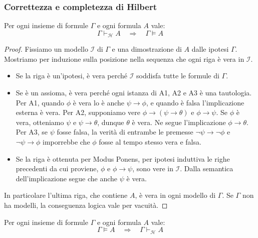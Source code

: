 \subsubsection*{Correttezza e completezza di Hilbert}
\noindent
\colorbox{SALZO}{\parbox{\dimexpr\linewidth-2\fboxsep}{
\begin{theorem}
    Per ogni insieme di formule $\Gamma$ e ogni formula $A$ vale:
    \[
        \Gamma\vdash_{\mathcal{H}} A
        \quad\Longrightarrow\quad
        \Gamma\models A
    \]
\end{theorem}
}}%

\begin{proof}
    Fissiamo un modello $\mathcal{I}$ di $\Gamma$ e una dimostrazione
    di $A$ dalle ipotesi $\Gamma$. Mostriamo per induzione sulla
    posizione nella sequenza che ogni riga è vera in $\mathcal{I}$.
    \begin{itemize}
        \item Se la riga è un'ipotesi, è vera perché $\mathcal{I}$
        soddisfa tutte le formule di $\Gamma$.
        \item Se è un assioma, è vera perché ogni istanza di A1, A2
        e A3 è una tautologia. Per A1, quando $\phi$ è vera lo è
        anche $\psi\to\phi$, e quando è falsa l'implicazione esterna
        è vera. Per A2, supponiamo vere $\phi\to(\psi\to\theta)$
        e $\phi\to\psi$. Se $\phi$ è vera, otteniamo $\psi$ e
        $\psi\to\theta$, dunque $\theta$ è vera. Ne segue
        l'implicazione $\phi\to\theta$. Per A3, se $\psi$ fosse
        falsa, la verità di entrambe le premesse
        $\neg\psi\to\neg\phi$ e $\neg\psi\to\phi$ imporrebbe
        che $\phi$ fosse al tempo stesso vera e falsa.
        \item Se la riga è ottenuta per Modus Ponens, per ipotesi
        induttiva le righe precedenti da cui proviene, $\phi$ e
        $\phi\to\psi$, sono vere in $\mathcal{I}$. Dalla semantica
        dell'implicazione segue che anche $\psi$ è vera.
    \end{itemize}
    In particolare l'ultima riga, che contiene $A$, è vera in ogni
    modello di $\Gamma$. Se $\Gamma$ non ha modelli, la conseguenza
    logica vale per vacuità.
\end{proof}

\noindent
\colorbox{SALZO}{\parbox{\dimexpr\linewidth-2\fboxsep}{
\begin{theorem}
    Per ogni insieme di formule $\Gamma$ e ogni formula $A$ vale:
    \[
        \Gamma\models A
        \quad\Longrightarrow\quad
        \Gamma\vdash_{\mathcal{H}} A
    \]
\end{theorem}
}}%

